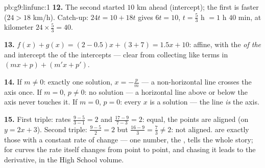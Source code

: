 \begin{solution}{pb:g9:linfunc:1}
\textbf{12.} The second started $10$ km ahead (intercept); the
first is faster ($24 > 18$ km/h). Catch-up:
$24t = 10 + 18t$ gives $6t = 10$, $t = \frac53$ h $= 1$ h $40$
min, at kilometer $24 \times \frac53 = 40$.

\textbf{13.} $f(x) + g(x) = (2 - 0.5)x + (3 + 7) = 1.5x + 10$:
affine, with  the \emph{ of the } and intercept
the  of the intercepts --- clear from collecting like terms
in $(mx + p) + (m'x + p')$.

\textbf{14.} If $m \neq 0$: exactly one solution,
$x = -\frac pm$ --- a non-horizontal line crosses the axis
once. If $m = 0$, $p \neq 0$: no solution --- a horizontal line
above or below the axis never touches it. If $m = 0$, $p = 0$:
every $x$ is a solution --- the line \emph{is} the axis.

\textbf{15.} First triple: rates $\frac{9 - 5}{3 - 1} = 2$ and
$\frac{17 - 9}{7 - 3} = 2$: equal, the points are aligned (on
$y = 2x + 3$). Second triple: $\frac{9-5}{2} = 2$ but
$\frac{16 - 9}{3} = \frac73 \neq 2$: not aligned.  are exactly those with a constant rate of change ---
one number, the , tells the whole story; for curves the
rate itself changes from point to point, and chasing it leads
to the derivative, in the High School volume.
\end{solution}
